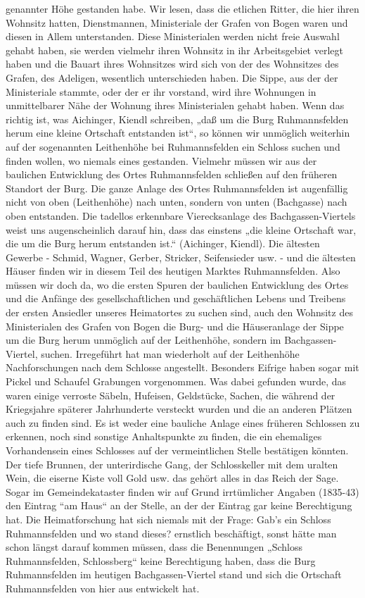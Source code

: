 \documentclass[12pt,a4paper]{book}
\begin{document}
genannter Höhe gestanden habe. Wir lesen, dass die etlichen Ritter, die
hier ihren Wohnsitz hatten, Dienstmannen, Ministeriale der Grafen von
Bogen waren und diesen in Allem unterstanden. Diese Ministerialen werden
nicht freie Auswahl gehabt haben, sie werden vielmehr ihren Wohnsitz in
ihr Arbeitsgebiet verlegt haben und die Bauart ihres Wohnsitzes wird
sich von der des Wohnsitzes des Grafen, des Adeligen, wesentlich
unterschieden haben. Die Sippe, aus der der Ministeriale stammte, oder
der er ihr vorstand, wird ihre Wohnungen in unmittelbarer Nähe der
Wohnung ihres Ministerialen gehabt haben. Wenn das richtig ist, was
Aichinger, Kiendl schreiben, „daß um die Burg Ruhmannsfelden herum eine
kleine Ortschaft entstanden ist“, so können wir unmöglich weiterhin auf
der sogenannten Leithenhöhe bei Ruhmannsfelden ein Schloss suchen und
finden wollen, wo niemals eines gestanden. Vielmehr müssen wir aus der
baulichen Entwicklung des Ortes Ruhmannsfelden schließen auf den
früheren Standort der Burg. Die ganze Anlage des Ortes Ruhmannsfelden
ist augenfällig nicht von oben (Leithenhöhe) nach unten, sondern von
unten (Bachgasse) nach oben entstanden. Die tadellos erkennbare
Vierecksanlage des Bachgassen-Viertels weist uns augenscheinlich darauf
hin, dass das einstens „die kleine Ortschaft war, die um die Burg herum
entstanden ist.“ (Aichinger, Kiendl). Die ältesten Gewerbe - Schmid,
Wagner, Gerber, Stricker, Seifensieder usw. - und die ältesten Häuser
finden wir in diesem Teil des heutigen Marktes Ruhmannsfelden. Also
müssen wir doch da, wo die ersten Spuren der baulichen Entwicklung des
Ortes und die Anfänge des gesellschaftlichen und geschäftlichen Lebens
und Treibens der ersten Ansiedler unseres Heimatortes zu suchen sind,
auch den Wohnsitz des Ministerialen des Grafen von Bogen die Burg- und
die Häuseranlage der Sippe um die Burg herum unmöglich auf der
Leithenhöhe, sondern im Bachgassen-Viertel, suchen. Irregeführt hat man
wiederholt auf der Leithenhöhe Nachforschungen nach dem Schlosse
angestellt. Besonders Eifrige haben sogar mit Pickel und Schaufel
Grabungen vorgenommen. Was dabei gefunden wurde, das waren einige
verroste Säbeln, Hufeisen, Geldstücke, Sachen, die während der
Kriegsjahre späterer Jahrhunderte versteckt wurden und die an anderen
Plätzen auch zu finden sind. Es ist weder eine bauliche Anlage eines
früheren Schlossen zu erkennen, noch sind sonstige Anhaltspunkte zu
finden, die ein ehemaliges Vorhandensein eines Schlosses auf der
vermeintlichen Stelle bestätigen könnten. Der tiefe Brunnen, der
unterirdische Gang, der Schlosskeller mit dem uralten Wein, die eiserne
Kiste voll Gold usw. das gehört alles in das Reich der Sage. Sogar im
Gemeindekataster finden wir auf Grund irrtümlicher Angaben (1835-43) den
Eintrag “am Haus“ an der Stelle, an der der Eintrag gar keine
Berechtigung hat. Die Heimatforschung hat sich niemals mit der Frage:
Gab’s ein Schloss Ruhmannsfelden und wo stand dieses? ernstlich
beschäftigt, sonst hätte man schon längst darauf kommen müssen, dass die
Benennungen „Schloss Ruhmannsfelden, Schlossberg“ keine Berechtigung
haben, dass die Burg Ruhmannsfelden im heutigen Bachgassen-Viertel stand
und sich die Ortschaft Ruhmannsfelden von hier aus entwickelt hat.
\end{document}
